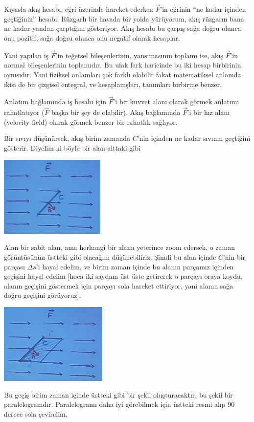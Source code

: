 \documentclass[12pt,fleqn]{article}\usepackage{../../common}
\begin{document}
Kıyasla akış hesabı, eğri üzerinde hareket ederken $\vec{F}$'in eğrinin
``ne kadar içinden geçtiğinin'' hesabı. Rüzgarlı bir havada bir yolda
yürüyorum, akış rüzgarın bana ne kadar yandan çarptığını gösteriyor. Akış
hesabı bu çarpış sağa doğru olunca onu pozitif, sağa doğru olunca onu
negatif olarak hesaplar. 

Yani yapılan iş $\vec{F}$'in teğetsel bileşenlerinin, yansımasının toplamı
ise, akış $\vec{F}$'in normal bileşenlerinin toplamıdır. Bu ufak fark
haricinde bu iki hesap birbirinin aynısıdır. Yani fiziksel anlamları çok
farklı olabilir fakat matematiksel anlamda ikisi de bir çizgisel entegral,
ve hesaplanışları, tanımları birbirine benzer. 

Anlatım bağlamında iş hesabı için $\vec{F}$'i bir kuvvet alanı olarak görmek
anlatımı rahatlatıyor ($\vec{F}$ başka bir şey de olabilir). Akış
bağlamında $\vec{F}$'i bir hız alanı (velocity field) olarak görmek
benzer bir rahatlık sağlıyor. 

Bir sıvıyı düşünürsek, akış birim zamanda $C$'nin içinden ne kadar sıvının
geçtiğini gösterir. Diyelim ki böyle bir alan alttaki gibi

\begin{center}

\includegraphics[height=4cm]{23_3.png}

\end{center}
Alan bir sabit alan, ama herhangi bir alana yeterince zoom edersek, o zaman
görüntüsünün üstteki gibi olacağını düşünebiliriz. Şimdi bu alan içinde
$C$'nin bir parçası $\Delta s$'i hayal edelim, ve birim zaman içinde bu
alanın parçamız içinden geçişini hayal edelim [hoca iki saydam üst üste
getirerek o parçayı oraya koydu, alanın geçişini göstermek için parçayı
sola hareket ettiriyor, yani alanın sağa doğru geçişini görüyoruz].

\begin{center}

\includegraphics[height=4cm]{23_4.png}

\end{center}
Bu geçiş birim zaman içinde üstteki gibi bir şekil oluşturacaktır, bu
şekil bir paralelogramdır. Paralelogramı daha iyi görebilmek için üstteki
resmi alıp 90 derece sola çevirelim, 
\end{document}
